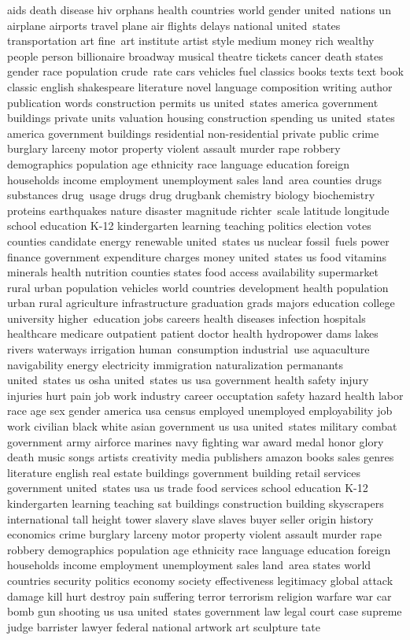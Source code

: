 aids
death
disease
hiv
orphans
health
countries
world
gender
united~nations
un
airplane
airports
travel
plane
air
flights
delays
national
united~states
transportation
art
fine~art
institute
artist
style
medium
money
rich
wealthy
people
person
billionaire
broadway
musical
theatre
tickets
cancer
death
states
gender
race
population
crude~rate
cars
vehicles
fuel
classics
books
texts
text
book
classic
english
shakespeare
literature
novel
language
composition
writing
author
publication
words
construction
permits
us
united~states
america
government
buildings
private
units
valuation
housing
construction
spending
us
united~states
america
government
buildings
residential
non-residential
private
public
crime
burglary
larceny
motor
property
violent
assault
murder
rape
robbery
demographics
population
age
ethnicity
race
language
education
foreign
households
income
employment
unemployment
sales
land~area
counties
drugs
substances
drug~usage
drugs
drug
drugbank
chemistry
biology
biochemistry
proteins
earthquakes
nature
disaster
magnitude
richter~scale
latitude
longitude
school
education
K-12
kindergarten
learning
teaching
politics
election
votes
counties
candidate
energy
renewable
united~states
us
nuclear
fossil~fuels
power
finance
government
expenditure
charges
money
united~states
us
food
vitamins
minerals
health
nutrition
counties
states
food
access
availability
supermarket
rural
urban
population
vehicles
world
countries
development
health
population
urban
rural
agriculture
infrastructure
graduation
grads
majors
education
college
university
higher~education
jobs
careers
health
diseases
infection
hospitals
healthcare
medicare
outpatient
patient
doctor
health
hydropower
dams
lakes
rivers
waterways
irrigation
human~consumption
industrial~use
aquaculture
navigability
energy
electricity
immigration
naturalization
permanants
united~states
us
osha
united~states
us
usa
government
health
safety
injury
injuries
hurt
pain
job
work
industry
career
occuptation
safety
hazard
health
labor
race
age
sex
gender
america
usa
census
employed
unemployed
employability
job
work
civilian
black
white
asian
government
us
usa
united~states
military
combat
government
army
airforce
marines
navy
fighting
war
award
medal
honor
glory
death
music
songs
artists
creativity
media
publishers
amazon
books
sales
genres
literature
english
real
estate
buildings
government
building
retail
services
government
united~states
usa
us
trade
food
services
school
education
K-12
kindergarten
learning
teaching
sat
buildings
construction
building
skyscrapers
international
tall
height
tower
slavery
slave
slaves
buyer
seller
origin
history
economics
crime
burglary
larceny
motor
property
violent
assault
murder
rape
robbery
demographics
population
age
ethnicity
race
language
education
foreign
households
income
employment
unemployment
sales
land~area
states
world
countries
security
politics
economy
society
effectiveness
legitimacy
global
attack
damage
kill
hurt
destroy
pain
suffering
terror
terrorism
religion
warfare
war
car
bomb
gun
shooting
us
usa
united~states
government
law
legal
court
case
supreme
judge
barrister
lawyer
federal
national
artwork
art
sculpture
tate
